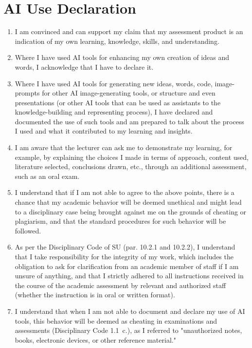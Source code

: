 \newpage

\section*{AI Use Declaration}

\begingroup
\small %

\begin{enumerate}
    \setlength\itemsep{0.5em} %
    \item I am convinced and can support my claim that my assessment product is an indication of my own learning, knowledge, skills, and understanding.
    \item Where I have used AI tools for enhancing my own creation of ideas and words, I acknowledge that I have to declare it.
    \item Where I have used AI tools for generating new ideas, words, code, image-prompts for other AI image-generating tools, or structure and even presentations (or other AI tools that can be used as assistants to the knowledge-building and representing process), I have declared and documented the use of such tools and am prepared to talk about the process I used and what it contributed to my learning and insights.
    \item I am aware that the lecturer can ask me to demonstrate my learning, for example, by explaining the choices I made in terms of approach, content used, literature selected, conclusions drawn, etc., through an additional assessment, such as an oral exam.
    \item I understand that if I am not able to agree to the above points, there is a chance that my academic behavior will be deemed unethical and might lead to a disciplinary case being brought against me on the grounds of cheating or plagiarism, and that the standard procedures for such behavior will be followed.
    \item As per the Disciplinary Code of SU (par. 10.2.1 and 10.2.2), I understand that I take responsibility for the integrity of my work, which includes the obligation to ask for clarification from an academic member of staff if I am unsure of anything, and that I strictly adhered to all instructions received in the course of the academic assessment by relevant and authorized staff (whether the instruction is in oral or written format).
    \item I understand that when I am not able to document and declare my use of AI tools, this behavior will be deemed as cheating in examinations and assessments (Disciplinary Code 1.1~c.), as I referred to "unauthorized notes, books, electronic devices, or other reference material."
\end{enumerate}

